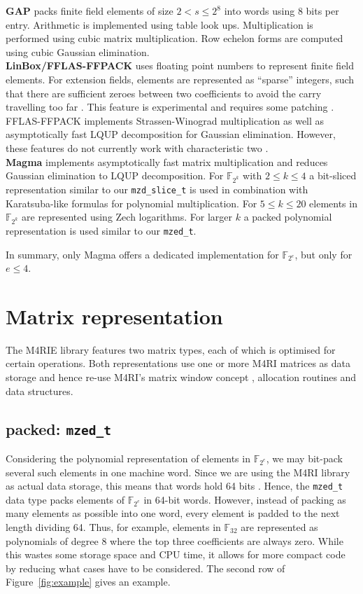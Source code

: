 \documentclass{sig-alternate}
\newcommand{\ring}[1]{\mathbb{#1}}
\newcommand{\F}{\ensuremath{\ring{F}}\xspace}
\newcommand{\FZE}{\ensuremath{\ring{F}_{2^e}}\xspace}
\newcommand{\mzedt}{\texttt{mzed\-\_t}\xspace}
\newcommand{\mzdslicet}{\texttt{mzd\-\_slice\-\_t}\xspace}
\begin{document}
\noindent\textbf{GAP} \cite{GAP4} packs finite field elements of size $2 < s \leq 2^8$ into words using 8 bits per entry. Arithmetic is implemented using table look ups.  Multiplication is performed using cubic matrix multiplication. Row echelon forms are computed using cubic Gaussian elimination.\\
\textbf{LinBox/FFLAS-FFPACK} \cite{FFPACK} uses floating point numbers to re\-present finite field elements. For extension fields, elements are represented as ``sparse'' integers, such that there are sufficient zeroes between two coefficients to avoid the carry travelling too far \cite{linbox-extensions}.  This feature is experimental and requires some patching \cite{linbox-extensions-implementation}. FFLAS-FFPACK implements Strassen-Wino\-grad multiplication as well as asymptotically fast LQUP decomposition for Gaussian elimination. However, these features do not currently work with characteristic two \cite{linbox-extensions-implementation}.\\
\textbf{Magma} \cite{magma} implements asymptotically fast matrix multiplication and reduces Gaussian elimination to LQUP decomposition. For $\F_{2^k}$ with $2 \leq k \leq 4$ a bit-sliced representation similar to our \mzdslicet is used in combination with Karatsuba-like formulas for polynomial multiplication. For $5 \leq k \leq 20$ elements in $\F_{2^k}$ are represented using Zech logarithms. For larger $k$ a packed polynomial representation is used similar to our \mzedt \cite{steel:gf2k}.

In summary, only Magma offers a dedicated implementation for $\FZE$, but only for $e \leq 4$.

\section{Matrix representation} \label{sec:representation}

The M4RIE library features two matrix types, each of which is optimised for certain operations. Both representations use one or more M4RI matrices as data storage and hence re-use M4RI's matrix window concept \cite{matmulgf2}, allocation routines and data structures.

\subsection{packed: \mzedt}  \label{sec:bitpacked}

Considering the polynomial representation of elements in \FZE, we may bit-pack several such elements in one machine word. Since we are using the M4RI library as actual data storage, this means that words hold 64 bits \cite{matmulgf2}. Hence, the \mzedt data type packs elements of \FZE in 64-bit words. However, instead of packing as many elements as possible into one word, every element is padded to the next length dividing 64. Thus, for example, elements in $\F_{32}$ are represented as polynomials of degree $8$ where the top three coefficients are always zero. While this wastes some storage space and CPU time, it allows for more compact code by reducing what cases have to be considered. The second row of Figure~\ref{fig:example} gives an example.
\end{document}
